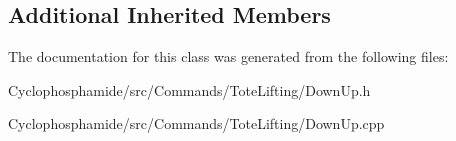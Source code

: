 \subsection*{Additional Inherited Members}


The documentation for this class was generated from the following files\+:\begin{DoxyCompactItemize}
\item 
Cyclophosphamide/src/\+Commands/\+Tote\+Lifting/Down\+Up.\+h\item 
Cyclophosphamide/src/\+Commands/\+Tote\+Lifting/Down\+Up.\+cpp\end{DoxyCompactItemize}
